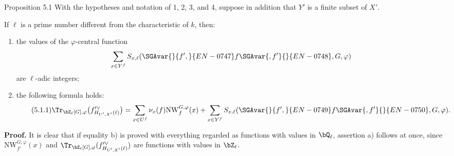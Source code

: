\begin{statement}{Proposition 5.1}
With the hypotheses and notation of 1, 2, 3, and 4, suppose in addition that $Y'$ is a finite subset of $X'$.

If $\ell$ is a prime number different from the characteristic of $k$, then:
\begin{enumerate}[label=\alph*)]
\item the values of the $\varphi$-central function
\[
\sum_{x\in Y^f}S_{x,\ell}(\SGAvar{}{f',}{EN-0747}f\SGAvar{,f'}{}{EN-0748},G,\varphi)
\]
are $\ell$-adic integers;
\item the following formula holds:
\begin{equation}\tag{5.1.1}
\Tr_{\bZ_\ell[G],\varphi}\bigl(f'^\vee_{H_{U',X'}(\ell)}\bigr)
=\sum_{x\in U^f}\nu_x(f)\mathrm{NW}^{G,\varphi}_f(x)
+\sum_{x\in Y^f}S_{x,\ell}(\SGAvar{}{f',}{EN-0749}f\SGAvar{,f'}{}{EN-0750},G,\varphi).
\end{equation}
\end{enumerate}
\end{statement}

\noindent
\textbf{Proof.} It is clear that if equality b) is proved with everything regarded as functions with values in $\bQ_\ell$, assertion a) follows at once, since $\mathrm{NW}^{G,\varphi}_{f'}(x)$ and $\Tr_{\bZ_\ell[G],\varphi}(f'^\vee_{H_{U',X'}(\ell)})$ are functions with values in $\bZ_\ell$.

